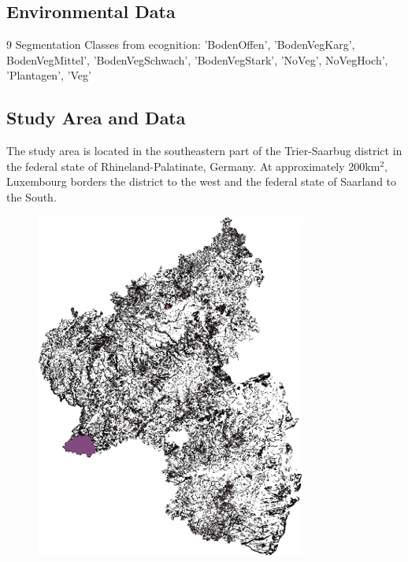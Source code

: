 \documentclass[authoryear, review,12pt,number]{elsarticle}
\begin{document}
\subsection{Environmental Data}

9 Segmentation Classes from ecognition:
'BodenOffen', 'BodenVegKarg', BodenVegMittel', 'BodenVegSchwach',
'BodenVegStark', 'NoVeg', NoVegHoch', 'Plantagen', 'Veg'

\subsection{Study Area and Data}
The study area is located in the southeastern part of the Trier-Saarbug district
in the federal state of Rhineland-Palatinate, Germany. At approximately
200km$^{2}$, Luxembourg borders the district to the west and the federal state
of Saarland to the South.
\begin{figure}
	\includegraphics[width=\textwidth]{diagrams/study_area_small.png}
\end{figure}
\end{document}
